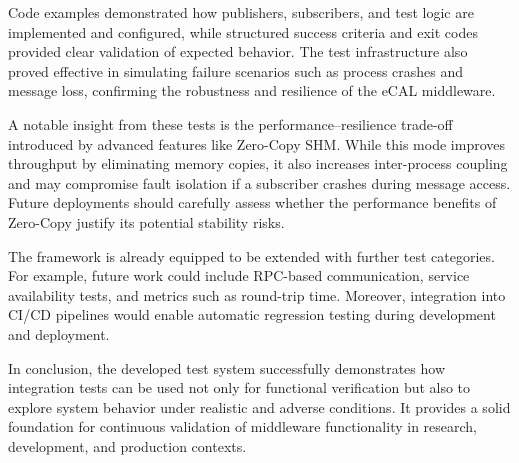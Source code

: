 \vspace{1em}
Code examples demonstrated how publishers, subscribers, and test logic are implemented and configured, while structured success criteria and exit codes provided clear validation of expected behavior. The test infrastructure also proved effective in simulating failure scenarios such as process crashes and message loss, confirming the robustness and resilience of the eCAL middleware.

\vspace{1em}
A notable insight from these tests is the performance–resilience trade-off introduced by advanced features like Zero-Copy SHM. While this mode improves throughput by eliminating memory copies, it also increases inter-process coupling and may compromise fault isolation if a subscriber crashes during message access. Future deployments should carefully assess whether the performance benefits of Zero-Copy justify its potential stability risks.

\vspace{1em}
The framework is already equipped to be extended with further test categories. For example, future work could include RPC-based communication, service availability tests, and metrics such as round-trip time. Moreover, integration into CI/CD pipelines would enable automatic regression testing during development and deployment.

\vspace{1em}
In conclusion, the developed test system successfully demonstrates how integration tests can be used not only for functional verification but also to explore system behavior under realistic and adverse conditions. It provides a solid foundation for continuous validation of middleware functionality in research, development, and production contexts.


